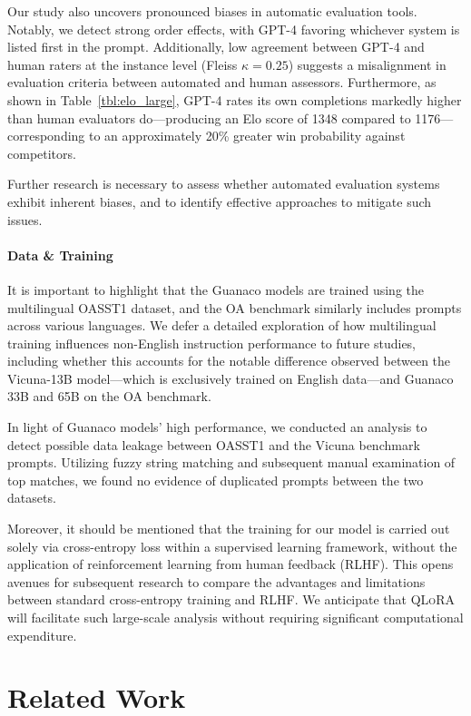 Our study also uncovers pronounced biases in automatic evaluation tools. Notably, we detect strong order effects, with GPT-4 favoring whichever system is listed first in the prompt. Additionally, low agreement between GPT-4 and human raters at the instance level (Fleiss $\kappa=0.25$) suggests a misalignment in evaluation criteria between automated and human assessors. Furthermore, as shown in Table~\ref{tbl:elo_large}, GPT-4 rates its own completions markedly higher than human evaluators do—producing an Elo score of 1348 compared to 1176—corresponding to an approximately 20\% greater win probability against competitors.

Further research is necessary to assess whether automated evaluation systems exhibit inherent biases, and to identify effective approaches to mitigate such issues.

\paragraph{Data \& Training} It is important to highlight that the {Guanaco} models are trained using the multilingual OASST1 dataset, and the OA benchmark similarly includes prompts across various languages. We defer a detailed exploration of how multilingual training influences non-English instruction performance to future studies, including whether this accounts for the notable difference observed between the Vicuna-13B model—which is exclusively trained on English data—and {Guanaco} 33B and 65B on the OA benchmark.

In light of {Guanaco} models' high performance, we conducted an analysis to detect possible data leakage between OASST1 and the Vicuna benchmark prompts. Utilizing fuzzy string matching and subsequent manual examination of top matches, we found no evidence of duplicated prompts between the two datasets.

Moreover, it should be mentioned that the training for our model is carried out solely via cross-entropy loss within a supervised learning framework, without the application of reinforcement learning from human feedback (RLHF). This opens avenues for subsequent research to compare the advantages and limitations between standard cross-entropy training and RLHF. We anticipate that \textsc{QLoRA} will facilitate such large-scale analysis without requiring significant computational expenditure.

\section{Related Work}

